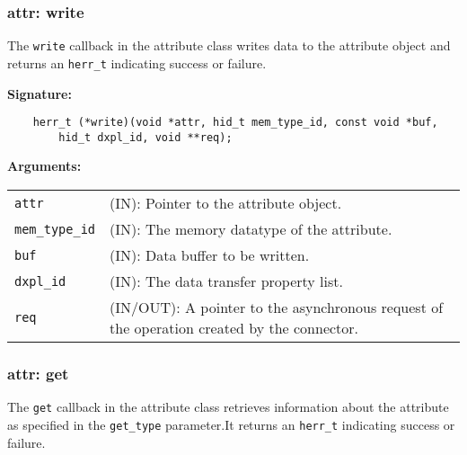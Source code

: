 \subsubsection{attr: write}
The \texttt{write} callback in the attribute class writes data to
the attribute object and returns an \texttt{herr\_t} indicating success or
failure.\bigskip

\begin{mdframed}[style=bgbox]
\textbf{Signature:}
\begin{lstlisting}
    herr_t (*write)(void *attr, hid_t mem_type_id, const void *buf, 
        hid_t dxpl_id, void **req);
\end{lstlisting}

\textbf{Arguments:}\\
\begin{tabular}{l p{13.5cm}}
  \texttt{attr} & (IN): Pointer to the attribute object.\\
  \texttt{mem\_type\_id} & (IN): The memory datatype of the attribute.\\
  \texttt{buf} & (IN): Data buffer to be written.\\
  \texttt{dxpl\_id} & (IN): The data transfer property list.\\
  \texttt{req} & (IN/OUT): A pointer to the asynchronous request of the
  operation created by the connector.\\
\end{tabular}
\end{mdframed}

\subsubsection{attr: get}
The \texttt{get} callback in the attribute class retrieves
information about the attribute as specified in the \texttt{get\_type}
parameter.It returns an \texttt{herr\_t} indicating success or failure.\bigskip

